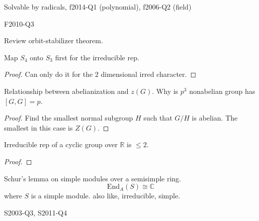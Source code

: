 \documentclass[openany]{book}
\newcommand{\R}{\mathbb{R}}
\newcommand{\C}{\mathbb{C}}
\begin{document}
\begin{prob}
    Solvable by radicals, f2014-Q1 (polynomial), f2006-Q2 (field)
\end{prob}

\begin{prob}
    F2010-Q3
\end{prob}

\begin{prob}
    Review orbit-stabilizer theorem.
\end{prob}


\begin{prob}
    Map $S_4$ onto $S_3$ first for the irreducible rep.
\end{prob}
\begin{proof}
    Can only do it for the $2$ dimensional irred character.
\end{proof}

\begin{prob}
    Relationship between abelianization and $z(G)$. Why is $p^3$ nonabelian group has $[G,G]=p$. 
\end{prob}
\begin{proof}
    Find the smallest normal subgroup $H$ such that $G/H$ is abelian. The smallest in this case is $Z(G)$.
\end{proof}




\begin{prob}
    Irreducible rep of a cyclic group over $\R$ is $\leq 2$.
\end{prob}
\begin{proof}
    
\end{proof}

\begin{prob}
    Schur's lemma on simple modules over a semisimple ring. 
    \begin{equation*}
        \text{End}_A(S)\cong\C
    \end{equation*}
    where $S$ is a simple module. also like, irreducible, simple.
\end{prob}

\begin{prob}
    S2003-Q3, S2011-Q4
\end{prob}

\end{document}
